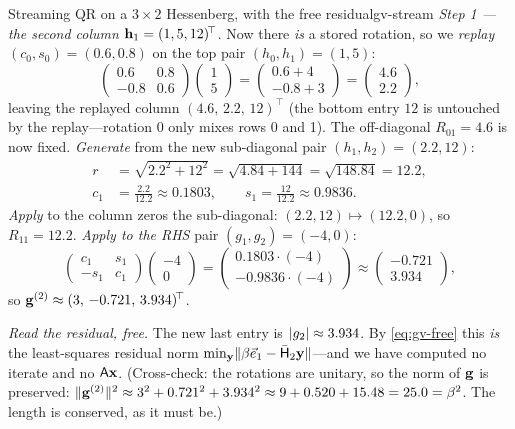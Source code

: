 \begin{workedexample}{Streaming QR on a $3\times2$ Hessenberg, with the free residual}{gv-stream}
\medskip\emph{Step 1 --- the second column} $\mathbf{h}_1 = (1,5,12)^{\!\top}$.
Now there \emph{is} a stored rotation, so we \emph{replay} $(c_0,s_0) = (0.6,0.8)$ on the
top pair $(h_0, h_1) = (1,5)$:
\[
  \begin{pmatrix} 0.6 & 0.8 \\ -0.8 & 0.6 \end{pmatrix}\!\begin{pmatrix} 1 \\ 5 \end{pmatrix}
  = \begin{pmatrix} 0.6 + 4 \\ -0.8 + 3 \end{pmatrix}
  = \begin{pmatrix} 4.6 \\ 2.2 \end{pmatrix},
\]
leaving the replayed column $(4.6,\,2.2,\,12)^{\!\top}$ (the bottom entry $12$ is
untouched by the replay---rotation 0 only mixes rows 0 and 1). The off-diagonal
$R_{01} = 4.6$ is now fixed. \emph{Generate} from the new sub-diagonal pair
$(h_1, h_2) = (2.2, 12)$:
\[
\begin{aligned}
  r &= \sqrt{2.2^2 + 12^2} = \sqrt{4.84 + 144} = \sqrt{148.84} = 12.2,\\
  c_1 &= \frac{2.2}{12.2} \approx 0.1803,\qquad s_1 = \frac{12}{12.2} \approx 0.9836.
\end{aligned}
\]
\emph{Apply} to the column zeros the sub-diagonal: $(2.2,12)\mapsto(12.2,0)$, so
$R_{11} = 12.2$. \emph{Apply to the RHS} pair $(g_1, g_2) = (-4, 0)$:
\[
  \begin{pmatrix} c_1 & s_1 \\ -s_1 & c_1 \end{pmatrix}\!\begin{pmatrix} -4 \\ 0 \end{pmatrix}
  = \begin{pmatrix} 0.1803\cdot(-4) \\ -0.9836\cdot(-4) \end{pmatrix}
  \approx \begin{pmatrix} -0.721 \\ 3.934 \end{pmatrix},
\]
so $\mathbf{g}^{(2)} \approx (3,\,-0.721,\,3.934)^{\!\top}$.

\medskip\emph{Read the residual, free.} The new last entry is
$\lvert g_2\rvert \approx 3.934$. By \cref{eq:gv-free} this \emph{is} the least-squares
residual norm $\min_{\mathbf{y}}\lVert\beta\vec e_1 - \bar{\mathsf{H}}_2\mathbf{y}\rVert$---and we have computed
no iterate and no $\mathsf{A}\mathbf{x}$. (Cross-check: the rotations are unitary, so the norm of
$\mathbf{g}$ is preserved: $\lVert\mathbf{g}^{(2)}\rVert^2 \approx 3^2 + 0.721^2 + 3.934^2 \approx 9 +
0.520 + 15.48 = 25.0 = \beta^2$. The length is conserved, as it must be.)


\end{workedexample}
